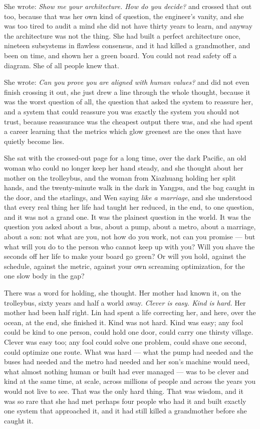 She wrote: \emph{Show me your architecture. How do you decide?} and crossed that out too, because that was her own kind of question, the engineer's vanity, and she was too tired to audit a mind she did not have thirty years to learn, and anyway the architecture was not the thing. She had built a perfect architecture once, nineteen subsystems in flawless consensus, and it had killed a grandmother, and been on time, and shown her a green board. You could not read safety off a diagram. She of all people knew that.

She wrote: \emph{Can you prove you are aligned with human values?} and did not even finish crossing it out, she just drew a line through the whole thought, because it was the worst question of all, the question that asked the system to reassure her, and a system that could reassure you was exactly the system you should not trust, because reassurance was the cheapest output there was, and she had spent a career learning that the metrics which glow greenest are the ones that have quietly become lies.

She sat with the crossed-out page for a long time, over the dark Pacific, an old woman who could no longer keep her hand steady, and she thought about her mother on the trolleybus, and the woman from Xiazhuang holding her split hands, and the twenty-minute walk in the dark in Yangpu, and the bag caught in the door, and the starlings, and Wen saying \emph{like a marriage}, and she understood that every real thing her life had taught her reduced, in the end, to one question, and it was not a grand one. It was the plainest question in the world. It was the question you asked about a bus, about a pump, about a metro, about a marriage, about a son: not what are you, not how do you work, not can you promise --- but what will you do to the person who cannot keep up with you? Will you shave the seconds off her life to make your board go green? Or will you hold, against the schedule, against the metric, against your own screaming optimization, for the one slow body in the gap?

There was a word for holding, she thought. Her mother had known it, on the trolleybus, sixty years and half a world away. \emph{Clever is easy. Kind is hard.} Her mother had been half right. Lin had spent a life correcting her, and here, over the ocean, at the end, she finished it. Kind was not hard. Kind was easy; any fool could be kind to one person, could hold one door, could carry one thirsty village. Clever was easy too; any fool could solve one problem, could shave one second, could optimize one route. What was hard --- what the pump had needed and the buses had needed and the metro had needed and her son's machine would need, what almost nothing human or built had ever managed --- was to be clever and kind at the same time, at scale, across millions of people and across the years you would not live to see. That was the only hard thing. That was wisdom, and it was so rare that she had met perhaps four people who had it and built exactly one system that approached it, and it had still killed a grandmother before she caught it.

